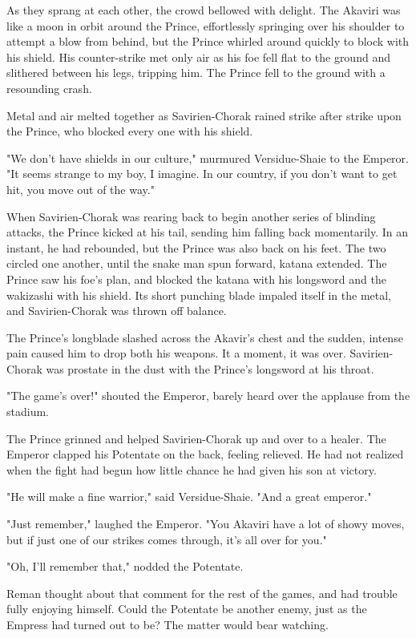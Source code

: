 As they sprang at each other, the crowd bellowed with delight. The Akaviri was like a moon in orbit around the Prince, effortlessly springing over his shoulder to attempt a blow from behind, but the Prince whirled around quickly to block with his shield. His counter-strike met only air as his foe fell flat to the ground and slithered between his legs, tripping him. The Prince fell to the ground with a resounding crash.

Metal and air melted together as Savirien-Chorak rained strike after strike upon the Prince, who blocked every one with his shield.

"We don't have shields in our culture," murmured Versidue-Shaie to the Emperor. "It seems strange to my boy, I imagine. In our country, if you don't want to get hit, you move out of the way."

When Savirien-Chorak was rearing back to begin another series of blinding attacks, the Prince kicked at his tail, sending him falling back momentarily. In an instant, he had rebounded, but the Prince was also back on his feet. The two circled one another, until the snake man spun forward, katana extended. The Prince saw his foe's plan, and blocked the katana with his longsword and the wakizashi with his shield. Its short punching blade impaled itself in the metal, and Savirien-Chorak was thrown off balance.

The Prince's longblade slashed across the Akavir's chest and the sudden, intense pain caused him to drop both his weapons. It a moment, it was over. Savirien-Chorak was prostate in the dust with the Prince's longsword at his throat.

"The game's over!" shouted the Emperor, barely heard over the applause from the stadium.

The Prince grinned and helped Savirien-Chorak up and over to a healer. The Emperor clapped his Potentate on the back, feeling relieved. He had not realized when the fight had begun how little chance he had given his son at victory.

"He will make a fine warrior," said Versidue-Shaie. "And a great emperor."

"Just remember," laughed the Emperor. "You Akaviri have a lot of showy moves, but if just one of our strikes comes through, it's all over for you."

"Oh, I'll remember that," nodded the Potentate.

Reman thought about that comment for the rest of the games, and had trouble fully enjoying himself. Could the Potentate be another enemy, just as the Empress had turned out to be? The matter would bear watching.

